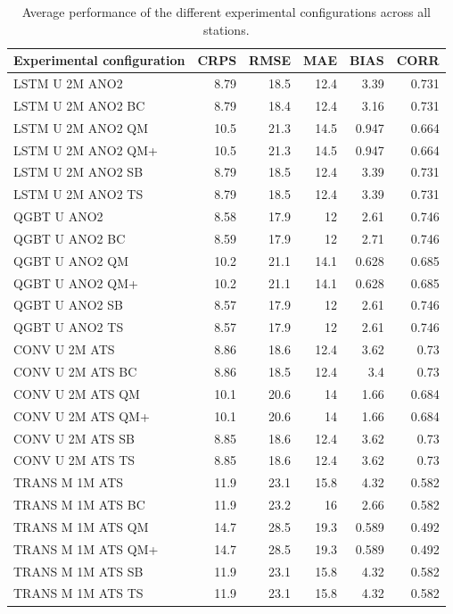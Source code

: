 \documentclass[12pt,a4paper]{book}
\begin{document}

\begin{landscape}
\begin{table}[h]
\centering

\begin{tabular}{lrrrrr}
\toprule
Experimental configuration & CRPS & RMSE & MAE & BIAS & CORR \\
\midrule
LSTM U 2M ANO2  & 8.79 & 18.5 & 12.4 & 3.39 & 0.731 \\
LSTM U 2M ANO2 BC & 8.79 & 18.4 & 12.4 & 3.16 & 0.731 \\
LSTM U 2M ANO2 QM & 10.5 & 21.3 & 14.5 & 0.947 & 0.664 \\
LSTM U 2M ANO2 QM+ & 10.5 & 21.3 & 14.5 & 0.947 & 0.664 \\
LSTM U 2M ANO2 SB & 8.79 & 18.5 & 12.4 & 3.39 & 0.731 \\
LSTM U 2M ANO2 TS & 8.79 & 18.5 & 12.4 & 3.39 & 0.731 \\
QGBT U ANO2  & 8.58 & 17.9 & 12 & 2.61 & 0.746 \\
QGBT U ANO2 BC & 8.59 & 17.9 & 12 & 2.71 & 0.746 \\
QGBT U ANO2 QM & 10.2 & 21.1 & 14.1 & 0.628 & 0.685 \\
QGBT U ANO2 QM+ & 10.2 & 21.1 & 14.1 & 0.628 & 0.685 \\
QGBT U ANO2 SB & 8.57 & 17.9 & 12 & 2.61 & 0.746 \\
QGBT U ANO2 TS & 8.57 & 17.9 & 12 & 2.61 & 0.746 \\
CONV U 2M ATS  & 8.86 & 18.6 & 12.4 & 3.62 & 0.73 \\
CONV U 2M ATS BC & 8.86 & 18.5 & 12.4 & 3.4 & 0.73 \\
CONV U 2M ATS QM & 10.1 & 20.6 & 14 & 1.66 & 0.684 \\
CONV U 2M ATS QM+ & 10.1 & 20.6 & 14 & 1.66 & 0.684 \\
CONV U 2M ATS SB & 8.85 & 18.6 & 12.4 & 3.62 & 0.73 \\
CONV U 2M ATS TS & 8.85 & 18.6 & 12.4 & 3.62 & 0.73 \\
TRANS M 1M ATS  & 11.9 & 23.1 & 15.8 & 4.32 & 0.582 \\
TRANS M 1M ATS BC & 11.9 & 23.2 & 16 & 2.66 & 0.582 \\
TRANS M 1M ATS QM & 14.7 & 28.5 & 19.3 & 0.589 & 0.492 \\
TRANS M 1M ATS QM+ & 14.7 & 28.5 & 19.3 & 0.589 & 0.492 \\
TRANS M 1M ATS SB & 11.9 & 23.1 & 15.8 & 4.32 & 0.582 \\
TRANS M 1M ATS TS & 11.9 & 23.1 & 15.8 & 4.32 & 0.582 \\
\bottomrule
\end{tabular}

\caption{Average performance of the different experimental configurations across all stations.}
\label{tab:exp3_complex1}
\end{table}

\end{landscape}
\restoregeometry
\end{document}
